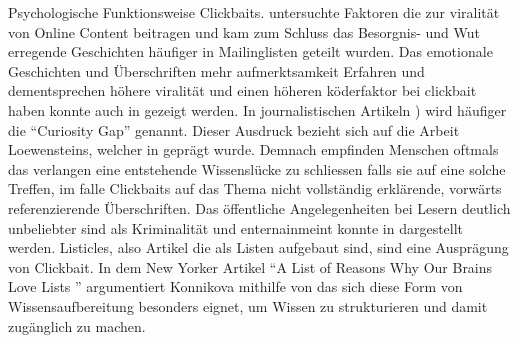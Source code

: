 Psychologische Funktionsweise Clickbaits. 
\cite{berger2012makes} untersuchte Faktoren die zur viralität von Online Content beitragen und kam zum Schluss das Besorgnis- und Wut erregende Geschichten häufiger in Mailinglisten geteilt wurden.  
Das emotionale Geschichten und Überschriften mehr aufmerktsamkeit Erfahren und dementsprechen höhere viralität und einen höheren köderfaktor bei clickbait haben konnte auch in \cite{guerini2015deep} gezeigt werden.
In journalistischen Artikeln \cite{site:psycholicalreasonsclickbait}) wird häufiger die \enquote{Curiosity Gap} genannt. Dieser Ausdruck bezieht sich auf die Arbeit Loewensteins, welcher in \cite{loewenstein1994psychology} geprägt wurde. Demnach empfinden Menschen oftmals das verlangen eine entstehende Wissenslücke zu schliessen falls sie auf eine solche Treffen, im falle Clickbaits auf das Thema nicht vollständig erklärende, vorwärts referenzierende Überschriften.
Das öffentliche Angelegenheiten bei Lesern deutlich unbeliebter sind als Kriminalität und enternainmeint konnte in \cite{hensinger2013modelling} dargestellt werden.
Listicles, also Artikel die als Listen aufgebaut sind, sind eine Ausprägung von Clickbait. In dem New Yorker Artikel \enquote{A List of Reasons Why Our Brains Love Lists
} argumentiert Konnikova mithilfe von \cite{messner2011unconscious} das sich diese Form von Wissensaufbereitung besonders eignet, um Wissen zu strukturieren und damit zugänglich zu machen. 









%
